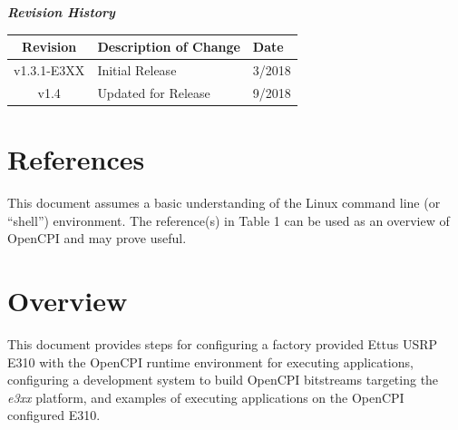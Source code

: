 	\begin{center}
	\textit{\textbf{Revision History}}
		\begin{table}[H]
		\label{table:revisions} %
			\begin{tabularx}{\textwidth}{|c|X|l|}
			\hline
			\rowcolor{blue}
			\textbf{Revision} & \textbf{Description of Change} & \textbf{Date} \\
		    \hline
		    v1.3.1-E3XX & Initial Release & 3/2018 \\
			\hline
		    v1.4 & Updated for Release & 9/2018 \\
			\hline
			\end{tabularx}
		\end{table}
	\end{center}

\newpage

\tableofcontents

\newpage

\section{References}
	This document assumes a basic understanding of the Linux command line (or ``shell'') environment.  The reference(s) in Table 1 can be used as an overview of OpenCPI and may prove useful.

\def\refcapbottom{}


\newpage
\section{Overview}
This document provides steps for configuring a factory provided Ettus USRP E310 with the OpenCPI runtime environment for executing applications, configuring a development system to build OpenCPI bitstreams targeting the \textit{e3xx} platform, and examples of executing applications on the OpenCPI configured E310.

